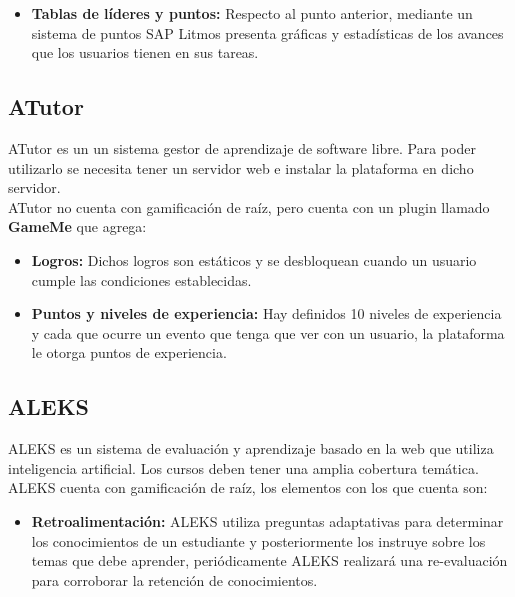 \begin{multicols*}{2}
\begin{itemize}
        \item {\bf Tablas de líderes y puntos:} Respecto al punto anterior,
        mediante un sistema de puntos SAP Litmos presenta gráficas y estadísticas
        de los avances que los usuarios tienen en sus tareas.

    \end{itemize}


\subsection{ATutor}

 ATutor \cite{PagATutor} es un un sistema gestor de aprendizaje de software libre. Para poder
 utilizarlo se necesita tener un servidor web e instalar la plataforma en dicho servidor.\\

    \noindent ATutor no cuenta con gamificación de raíz,
    pero cuenta con un plugin llamado \textbf{GameMe} que agrega:

    \begin{itemize}
        \item {\bf Logros:} Dichos logros son estáticos y se
        desbloquean cuando un usuario cumple las condiciones
        establecidas.

        \item {\bf Puntos y niveles de experiencia:} Hay definidos 10
        niveles de experiencia y cada que ocurre un evento que tenga
        que ver con un usuario, la plataforma le otorga puntos de
        experiencia.

    \end{itemize}



\subsection{ALEKS}

 ALEKS \cite{PagALEKS} es un sistema de evaluación y aprendizaje basado en la web que
 utiliza inteligencia artificial. Los cursos deben tener una amplia cobertura temática.\\

 \noindent ALEKS cuenta con gamificación de raíz, los elementos con los que cuenta son:

    \begin{itemize}
        \item {\bf Retroalimentación:} ALEKS utiliza preguntas adaptativas para
            determinar los conocimientos de un estudiante y posteriormente los
            instruye sobre los temas que debe aprender, periódicamente ALEKS
            realizará una re-evaluación para corroborar la retención de
            conocimientos.


\end{itemize}
\end{multicols*}
